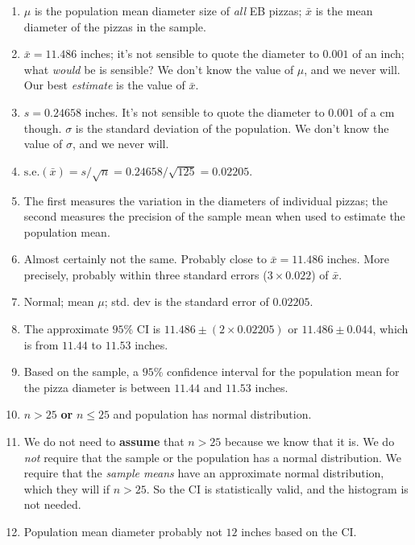 \documentclass[
  11pt,
  a4paper,
  krantz2]{krantz}
\providecommand{\tightlist}{%
  \setlength{\itemsep}{0pt}\setlength{\parskip}{0pt}}
\begin{document}
\begin{footnotesize}
\begin{enumerate}
\def\labelenumi{\arabic{enumi}.}
\tightlist
\item
  \(\mu\) is the population mean diameter size of \emph{all} EB pizzas;
  \(\bar{x}\) is the mean diameter of the pizzas in the sample.
\item
  \(\bar{x} = 11.486\) inches; it's not sensible to quote the diameter to \(0.001\) of an inch; what \emph{would} be is sensible?
  We don't know the value of \(\mu\), and we never will.
  Our best \emph{estimate} is the value of \(\bar{x}\).
\item
  \(s = 0.24658\) inches.
  It's not sensible to quote the diameter to \(0.001\) of a cm though.
  \(\sigma\) is the standard deviation of the population.
  We don't know the value of \(\sigma\), and we never will.
\item
  \(\displaystyle\text{s.e.}(\bar{x}) = s/\sqrt{n} = 0.24658/\sqrt{125} = 0.02205\).
\item
  The first measures the variation in the diameters of individual pizzas; the second measures the precision of the sample mean when used to estimate the population mean.
\item
  Almost certainly not the same.
  Probably close to \(\bar{x} = 11.486\) inches.
  More precisely, probably within three standard errors (\(3\times 0.022\)) of \(\bar{x}\).
\item
  Normal; mean \(\mu\); std. dev is the standard error of \(0.02205\).
\item
  The approximate \(95\)\% CI is \(11.486\pm (2\times 0.02205)\) or \(11.486\pm0.044\), which is from \(11.44\) to \(11.53\) inches.
\item
  Based on the sample, a \(95\)\% confidence interval for the population mean for the pizza diameter is between \(11.44\) and \(11.53\) inches.
\item
  \(n > 25\) \textbf{or} \(n\le 25\) and population has normal distribution.
\item
  We do not need to \textbf{assume} that \(n > 25\) because we know that it is.
  We do \emph{not} require that the sample or the population has a normal distribution.
  We require that the \emph{sample means} have an approximate normal distribution, which they will if \(n > 25\).
  So the CI is statistically valid, and the histogram is not needed.
\item
  Population mean diameter probably not \(12\) inches based on the CI.
\end{enumerate}


\end{footnotesize}
\end{document}
